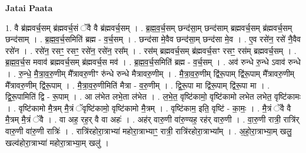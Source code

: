 \documentclass[17pt]{extarticle}
\begin{document}
\textbf{Jatai Paata} \newline

1. वै ब्र॑ह्मवर्च॒सम् ब्र॑ह्मवर्च॒सं ॅवै वै ब्र॑ह्मवर्च॒सम् । . ब्र॒ह्म॒व॒र्च॒सम् छन्द॑सा॒म् छन्द॑साम् ब्रह्मवर्च॒सम् ब्र॑ह्मवर्च॒सम् छन्द॑साम् । . ब्र॒ह्म॒व॒र्च॒समिति॑ ब्रह्म - व॒र्च॒सम् । . छन्द॑सा मे॒वैव छन्द॑सा॒म् छन्द॑सा मे॒व । . ए॒व रसे॑न॒ रसे॑ नै॒वैव रसे॑न । . रसे॑न॒ रसꣳ॒॒ रसꣳ॒॒ रसे॑न॒ रसे॑न॒ रस᳚म् । . रस॑म् ब्रह्मवर्च॒सम् ब्र॑ह्मवर्च॒सꣳ रसꣳ॒॒ रस॑म् ब्रह्मवर्च॒सम् । . ब्र॒ह्म॒व॒र्च॒स मवाव॑ ब्रह्मवर्च॒सम् ब्र॑ह्मवर्च॒स मव॑ । . ब्र॒ह्म॒व॒र्च॒समिति॑ ब्रह्म - व॒र्च॒सम् । . अव॑ रुन्धे रु॒न्धे ऽवाव॑ रुन्धे । . रु॒न्धे॒ मै॒त्रा॒व॒रु॒णीम् मै᳚त्रावरु॒णीꣳ रु॑न्धे रुन्धे मैत्रावरु॒णीम् । . मै॒त्रा॒व॒रु॒णीम् द्वि॑रू॒पाम् द्वि॑रू॒पाम् मै᳚त्रावरु॒णीम् मै᳚त्रावरु॒णीम् द्वि॑रू॒पाम् । . मै॒त्रा॒व॒रु॒णीमिति॑ मैत्रा - व॒रु॒णीम् । . द्वि॒रू॒पा मा द्वि॑रू॒पाम् द्वि॑रू॒पा मा । . द्वि॒रू॒पामिति॑ द्वि - रू॒पाम् । . आ ल॑भेत लभे॒ता ल॑भेत । . ल॒भे॒त॒ वृष्टि॑कामो॒ वृष्टि॑कामो लभेत लभेत॒ वृष्टि॑कामः । . वृष्टि॑कामो मै॒त्रम् मै॒त्रं ॅवृष्टि॑कामो॒ वृष्टि॑कामो मै॒त्रम् । . वृष्टि॑काम॒ इति॒ वृष्टि॑ - का॒मः॒ । . मै॒त्रं ॅवै वै मै॒त्रम् मै॒त्रं ॅवै । . वा अह॒ रह॒र् वै वा अहः॑ । . अह॑र् वारु॒णी वा॑रु॒ण्यह॒ रह॑र् वारु॒णी । . वा॒रु॒णी रात्री॒ रात्रि॑र् वारु॒णी वा॑रु॒णी रात्रिः॑ । . रात्रि॑रहोरा॒त्राभ्या॑ महोरा॒त्राभ्याꣳ॒॒ रात्री॒ रात्रि॑रहोरा॒त्राभ्या᳚म् । . अ॒हो॒रा॒त्राभ्या॒म् खलु॒ खल्व॑होरा॒त्राभ्या॑ महोरा॒त्राभ्या॒म् खलु॑ । \newline
\end{document}
